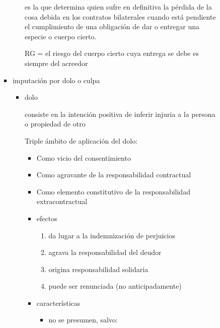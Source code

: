 \documentclass[]{article}
\providecommand{\tightlist}{%
  \setlength{\itemsep}{0pt}\setlength{\parskip}{0pt}}
\begin{document}
\begin{itemize}
\begin{itemize}
\begin{itemize}
\begin{itemize}
\begin{itemize}
          es la que determina quien sufre en definitiva la pérdida de la
          cosa debida en los contratos bilaterales cuando está pendiente
          el cumplimiento de una obligación de dar o entregar una
          especie o cuerpo cierto.

          RG = el riesgo del cuerpo cierto cuya entrega se debe es
          siempre del acreedor
        \end{itemize}
      \item
        imputación por dolo o culpa

        \begin{itemize}
        \item
          dolo

          consiste en la intención positiva de inferir injuria a la
          persona o propiedad de otro

          Triple ámbito de aplicación del dolo:

          \begin{itemize}
          \item
            Como vicio del consentimiento
          \item
            Como agravante de la responsabilidad contractual
          \item
            Como elemento constitutivo de la responsabilidad
            extracontractual
          \item
            efectos

            \begin{enumerate}
            \def\labelenumi{\arabic{enumi}.}
            \tightlist
            \item
              da lugar a la indemnización de perjuicios
            \item
              agrava la responsabilidad del deudor
            \item
              origina responsabilidad solidaria
            \item
              puede ser renunciada (no anticipadamente)
            \end{enumerate}
          \item
            características

            \begin{itemize}
            \tightlist
            \item
              no se presumen, salvo:


\end{itemize}
\end{itemize}
\end{itemize}
\end{itemize}
\end{itemize}
\end{itemize}
\end{itemize}
\end{document}
